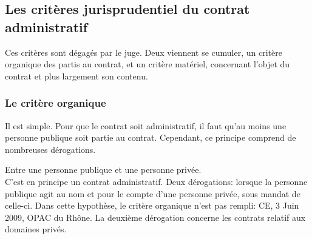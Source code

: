 \documentclass[10pt, a4paper, openany]{book}
\begin{document}
\subsection{Les critères jurisprudentiel du contrat administratif}

Ces critères sont dégagés par le juge. Deux viennent se cumuler, un critère organique des partis au contrat, et un critère matériel, concernant l'objet du contrat et plus largement son contenu.

\subsubsection{Le critère organique}

Il est simple. Pour que le contrat soit administratif, il faut qu'au moins une personne publique soit partie au contrat. Cependant, ce principe comprend de nombreuses dérogations. 


Entre une personne publique et une personne privée. \\
C'est en principe un contrat administratif. Deux dérogations: lorsque la personne publique agit au nom et pour le compte d'une personne privée, sous mandat de celle-ci. Dans cette hypothèse, le critère organique n'est pas rempli: CE, 3 Juin 2009, OPAC du Rhône. La deuxième dérogation concerne les contrats relatif aux domaines privés.
\end{document}
